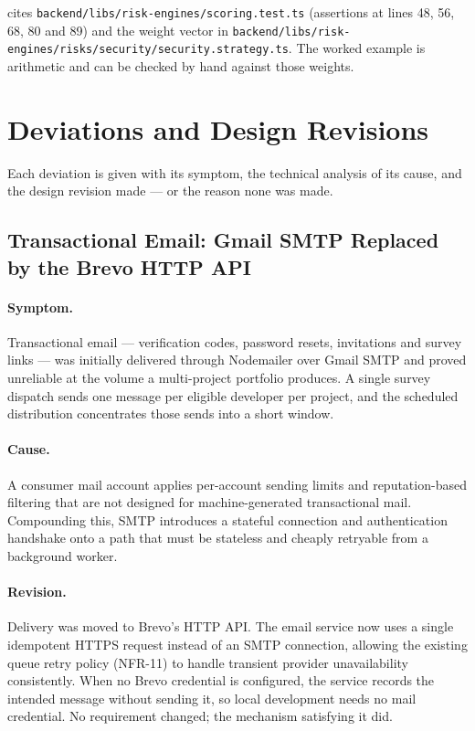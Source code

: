 cites \nolinkurl{backend/libs/risk-engines/scoring.test.ts}
(assertions at lines 48, 56, 68, 80 and 89) and the weight vector in
\nolinkurl{backend/libs/risk-engines/risks/security/security.strategy.ts}. The
worked example is arithmetic and can be checked by hand against those weights.

\section{Deviations and Design Revisions}
\label{sec:deviations}

Each deviation is given with its symptom, the technical analysis of its cause,
and the design revision made --- or the reason none was made.

\subsection{Transactional Email: Gmail SMTP Replaced by the Brevo HTTP API}
\label{subsec:deviation-email}

\paragraph{Symptom.} Transactional email --- verification codes, password
resets, invitations and survey links --- was initially delivered through
Nodemailer over Gmail SMTP and proved unreliable at the volume a multi-project
portfolio produces. A single survey dispatch sends one message per eligible
developer per project, and the scheduled distribution concentrates those sends
into a short window.

\paragraph{Cause.} A consumer mail account applies per-account sending limits
and reputation-based filtering that are not designed for machine-generated
transactional mail. Compounding this, SMTP introduces a stateful connection and
authentication handshake onto a path that must be stateless and cheaply
retryable from a background worker.

\paragraph{Revision.} Delivery was moved to Brevo's HTTP API. The email service
now uses a single idempotent HTTPS request instead of an SMTP connection,
allowing the existing queue retry policy (NFR-11) to handle transient provider
unavailability consistently. When no Brevo credential is configured, the service
records the intended message without sending it, so local development needs no
mail credential. No requirement changed; the mechanism satisfying it did.

